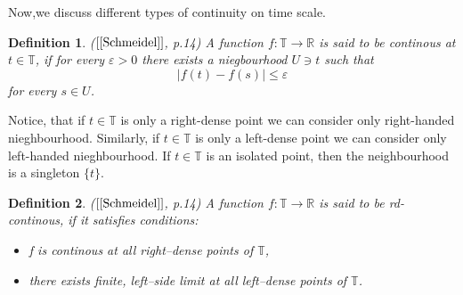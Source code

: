 \documentclass[12pt,a4paper,oneside,titlepage]{article}
\newtheorem{Def}{Definition}
\renewcommand{\epsilon}{\varepsilon}
\begin{document}
Now,we discuss different types of continuity on time scale.
\begin{Def}($[\ref{Schmeidel}]$, p.14) A function $f:\mathbb{T} \rightarrow \mathbb{R}$ is said to be continous at $t \in \mathbb{T}$, if for every $\epsilon >0$ there exists a niegbourhood $U \ni t$ such that
\begin{equation}
\vert f(t) - f(s) \vert \leq \epsilon
\end{equation}
for every $s \in U$.
\end{Def}

Notice, that if $t \in \mathbb{T}$ is only a right-dense point we can consider only right-handed nieghbourhood. Similarly,  if $t \in \mathbb{T}$ is only a left-dense point we can consider only left-handed nieghbourhood. If $t \in \mathbb{T} $ is an isolated point, then the neighbourhood is a singleton $\lbrace t \rbrace$.


\begin{Def}($[\ref{Schmeidel}]$, p.14) A function $f:\mathbb{T} \rightarrow \mathbb{R}$ is said to be rd-continous, if it satisfies conditions:
\begin{itemize}
\item[$(a)$] f is continous at all right--dense points of $\mathbb{T}$,
\item[$(b)$] there exists finite, left--side limit at all left--dense points of $\mathbb{T}$.
\end{itemize}
\end{Def}
\end{document}
